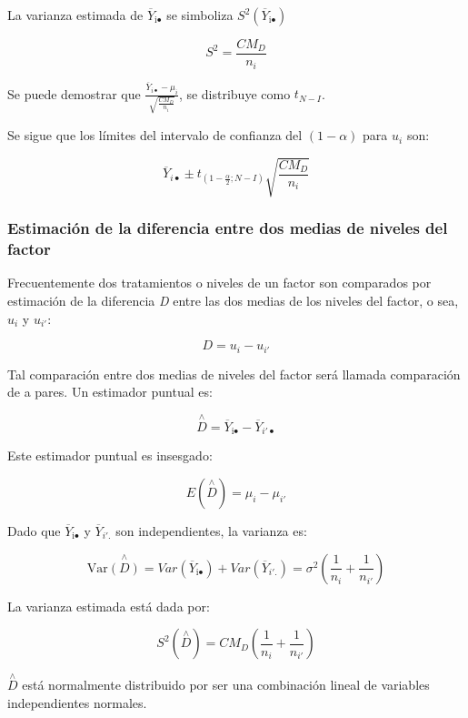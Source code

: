 \documentclass[]{book}
\theoremstyle{definition}
\theoremstyle{definition}
\theoremstyle{definition}
\theoremstyle{remark}
\begin{document}
La varianza estimada de \({\overline{Y}}_{\text{i}\bullet}\) se
simboliza \(S^{2}({\overline{Y}}_{\text{i}\bullet})\)

\[
S^{2} = \frac{CM_D}{n_{i}}
\]

Se puede demostrar que
\(\frac{{\overline{Y}}_{i\bullet} - \mu_{i}}{\sqrt{\frac{CM_D}{n_{i}}}}\),
se distribuye como \(t_{N - I}\).

Se sigue que los límites del intervalo de confianza del \((1 - \alpha)\)
para \(u_{i}\) son:

\[
{\overline{Y}}_{i\bullet} \pm t_{\left( 1 - \frac{\alpha}{2};N - I \right)}\sqrt{\frac{CM_D}{n_{i}}}
\]

\hypertarget{estimacion-de-la-diferencia-entre-dos-medias-de-niveles-del-factor}{%
\subsubsection{Estimación de la diferencia entre dos medias de niveles
del
factor}\label{estimacion-de-la-diferencia-entre-dos-medias-de-niveles-del-factor}}

Frecuentemente dos tratamientos o niveles de un factor son comparados
por estimación de la diferencia \emph{D} entre las dos medias de los
niveles del factor, o sea, \(u_{i}\) y \(u_{i'}\):

\[
D = u_{i} - u_{i'}
\]

Tal comparación entre dos medias de niveles del factor será llamada
comparación de a pares. Un estimador puntual es:

\[
\overset{\land}{D} = {\overline{Y}}_{\text{i}\bullet} - {\overline{Y}}_{i'\bullet}
\]

Este estimador puntual es insesgado:

\[
E\left( \overset{\land}{D} \right) = \mu_{i} - \mu_{i'}
\]

Dado que \({\overline{Y}}_{\text{i}\bullet}\) y \({\overline{Y}}_{i'.}\)
son independientes, la varianza es:

\[
\text{Var}\overset{\land}{\left( D \right)} = Var\left( {\overline{Y}}_{\text{i}\bullet} \right) + Var\left( {\overline{Y}}_{i'.} \right) = \sigma^{2}\left( \frac{1}{n_{i}} + \frac{1}{n_{i'}} \right)
\]

La varianza estimada está dada por:

\[
S^{2}\left( \overset{\land}{D} \right) = CM_D\left( \frac{1}{n_{i}} + \frac{1}{n_{i'}} \right)
\]

\(\overset{\land}{D}\) está normalmente distribuido por ser una
combinación lineal de variables independientes normales.
\end{document}
